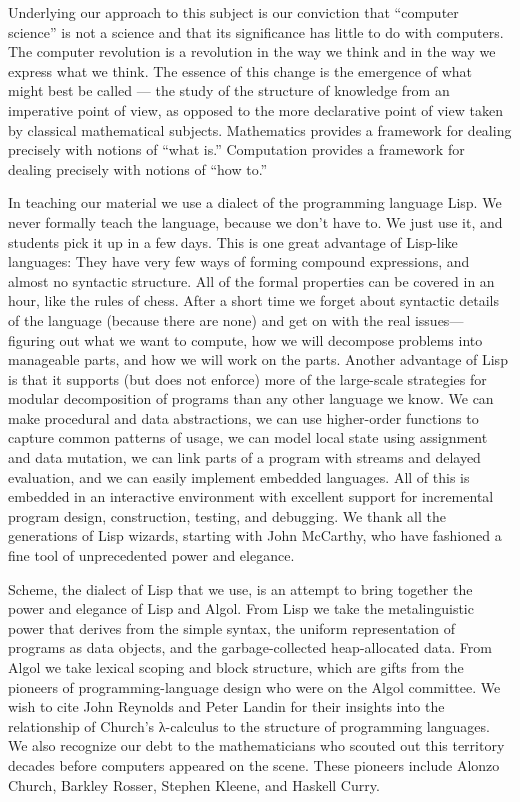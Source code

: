 Underlying our approach to this subject is our conviction that “computer science” is not a science and that its significance has little to do with computers.
The computer revolution is a revolution in the way we think and in the way we express what we think.
The essence of this change is the emergence of what might best be called ---%
the study of the structure of knowledge from an imperative point of view, as opposed to the
more declarative point of view taken by classical mathematical subjects.
Mathematics provides a framework for dealing precisely with notions of “what is.”
Computation provides a framework for dealing precisely with notions of “how to.”

In teaching our material we use a dialect of the programming language Lisp.
We never formally teach the language, because we don’t have to.
We just use it, and students pick it up in a few days.
This is one great advantage of Lisp-like languages:
They have very few ways of forming compound expressions, and almost no syntactic structure.
All of the formal properties can be covered in an hour, like the rules of chess.
After a short time we forget about syntactic details of the language (because there are none) and get on with the real issues---%
figuring out what we want to compute, how we will decompose problems into manageable parts, and how we will work on the parts.
Another advantage of Lisp is that it supports (but does not enforce) more of the large-scale strategies for modular decomposition of programs than any other language we know.
We can make procedural and data abstractions, we can use higher-order functions to capture common patterns of usage, we can model local state using assignment and data mutation, we can link parts of a program with streams and delayed evaluation, and we can easily implement embedded languages.
All of this is embedded in an interactive environment with excellent support for incremental program design, construction, testing, and debugging.
We thank all the generations of Lisp wizards, starting with John McCarthy, who have fashioned a fine tool of unprecedented power and elegance.

Scheme, the dialect of Lisp that we use, is an attempt to bring together the power and elegance of Lisp and Algol.
From Lisp we take the metalinguistic power that derives from the simple syntax, the uniform representation of programs as data objects, and the garbage-collected heap-allocated data.
From Algol we take lexical scoping and block structure, which are gifts from the pioneers of programming-language design who were on the Algol committee.
We wish to cite John Reynolds and Peter Landin for their insights into the relationship of Church's λ-calculus to the structure of programming languages.
We also recognize our debt to the mathematicians who scouted out this territory decades before computers appeared on the scene.
These pioneers include Alonzo Church, Barkley Rosser, Stephen Kleene, and Haskell Curry.


